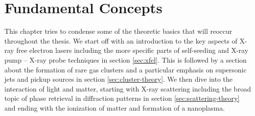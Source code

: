 \chapter{Fundamental Concepts}\label{ch:fundamental_concepts}
This chapter tries to condense some of the theoretic basics that will reoccur throughout the thesis. We start off with an introduction to the key aspects of X-ray free electron lasers including the more specific parts of self-seeding and X-ray pump -- X-ray probe techniques in section \ref{sec:xfel}. This is followed by a section about the formation of rare gas clusters and a particular emphasis on supersonic jets and pickup sources in section \ref{sec:cluster-theory}. We then dive into the interaction of light and matter, starting with X-ray scattering including the broad topic of phase retrieval in diffraction patterns in section \ref{sec:scattering-theory} and ending with the ionization of matter and formation of a nanoplasma.
